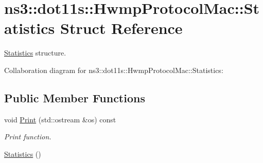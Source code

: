\hypertarget{structns3_1_1dot11s_1_1HwmpProtocolMac_1_1Statistics}{}\section{ns3\+:\+:dot11s\+:\+:Hwmp\+Protocol\+Mac\+:\+:Statistics Struct Reference}
\label{structns3_1_1dot11s_1_1HwmpProtocolMac_1_1Statistics}


\hyperlink{structns3_1_1dot11s_1_1HwmpProtocolMac_1_1Statistics}{Statistics} structure.  




Collaboration diagram for ns3\+:\+:dot11s\+:\+:Hwmp\+Protocol\+Mac\+:\+:Statistics\+:
\subsection*{Public Member Functions}
\begin{DoxyCompactItemize}
\item 
void \hyperlink{structns3_1_1dot11s_1_1HwmpProtocolMac_1_1Statistics_a1cb56979a1707105d9b2b70dee03f119}{Print} (std\+::ostream \&os) const 
\begin{DoxyCompactList}\small\item\em Print function. \end{DoxyCompactList}\item 
\hyperlink{structns3_1_1dot11s_1_1HwmpProtocolMac_1_1Statistics_af9bbfa4116149c661e31fc6f9bd5e26f}{Statistics} ()
\end{DoxyCompactItemize}
